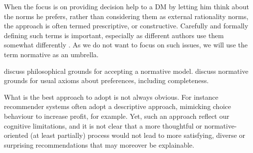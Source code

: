 \documentclass[french, english]{llncs}
\begin{document}
	
	When the focus is on providing decision help to a \ac{DM} by letting him think about the norms he prefers, rather than considering them as external rationality norms, %
	the approach is often termed prescriptive, or constructive. Carefully and formally defining such terms is important, especially as different authors use them somewhat differently \citep{roy_decision_1993, tsoukias_concept_2007}. As we do not want to focus on such issues, we will use the term normative as an umbrella.

 \citet{mcclennen_rationality_1990, guala_logic_2000} discuss philosophical grounds for accepting a normative model. \citet{anand_are_1987, mandler_difficult_2001} discuss normative grounds for usual axioms about preferences, including completeness.
	
	What is the best approach to adopt is not always obvious. For instance recommender systems often adopt a descriptive approach, mimicking choice behaviour to increase profit, for example. Yet, such an approach reflect our cognitive limitations, and it is not clear that a more thoughtful or normative-oriented (at least partially) process would not lead to more satisfying, diverse or surprising recommendations that may moreover be explainable.
	
	
\end{document}
